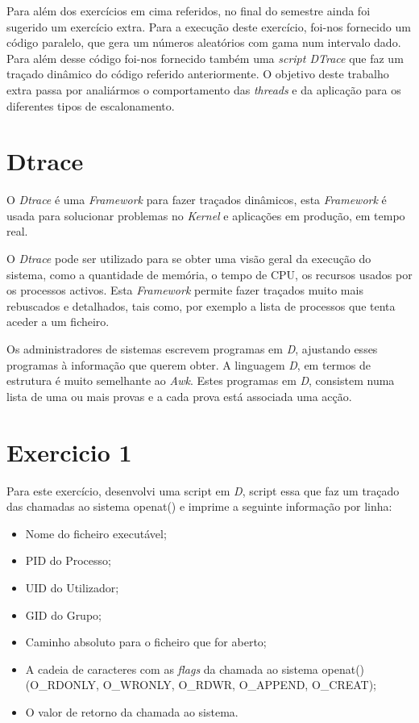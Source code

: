 \documentclass[conference,compsoc]{IEEEtran}
\begin{document}
Para além dos exercícios em cima referidos, no final do semestre ainda foi sugerido um exercício extra. Para a execução deste exercício, foi-nos fornecido um código paralelo, que gera um números aleatórios com gama num intervalo dado. Para além desse código foi-nos fornecido também uma \textit{script DTrace} que faz um traçado dinâmico do código referido anteriormente. O objetivo deste trabalho extra passa por analiármos o comportamento das \textit{threads} e da aplicação para os diferentes tipos de escalonamento.


\section{Dtrace}
O \textit{Dtrace} é uma \textit{Framework} para fazer traçados dinâmicos, esta \textit{Framework} é usada para solucionar problemas no \textit{Kernel} e aplicações em produção, em tempo real.

O \textit{Dtrace} pode ser utilizado para se obter uma visão geral da execução do sistema, como a quantidade de memória, o tempo de CPU, os recursos usados por os processos activos. Esta \textit{Framework} permite fazer traçados muito mais rebuscados e detalhados, tais como, por exemplo a lista de processos que tenta aceder a um ficheiro.

Os administradores de sistemas escrevem programas em \textit{D}, ajustando esses programas à informação que querem obter. A linguagem \textit{D}, em termos de estrutura é muito semelhante ao \textit{Awk}. Estes programas em \textit{D}, consistem numa lista de uma ou mais provas e a cada prova está associada uma acção.

\section{Exercicio 1}
Para este exercício, desenvolvi uma script em \textit{D}, script essa que faz um traçado das chamadas ao sistema openat() e imprime a seguinte informação por linha:
\begin{itemize}
\item Nome do ficheiro executável;
\item PID do Processo;
\item UID do Utilizador;
\item GID do Grupo;
\item Caminho absoluto para o ficheiro que for aberto;
\item A cadeia de caracteres com as \textit{flags} da chamada ao sistema openat() (O\_RDONLY, O\_WRONLY, O\_RDWR, O\_APPEND, O\_CREAT);
\item O valor de retorno da chamada ao sistema.
\end{itemize}
\end{document}
